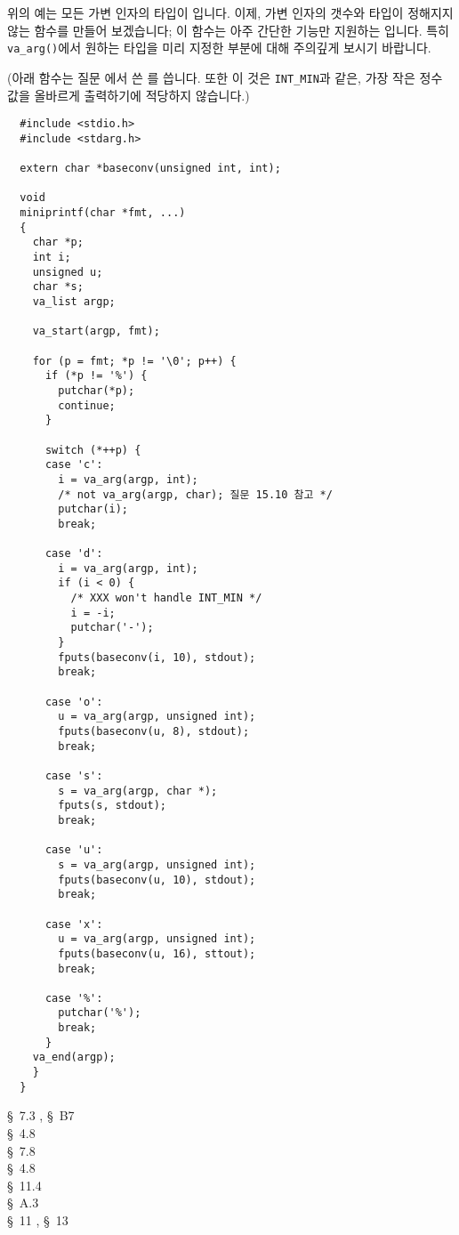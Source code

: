 \begin{faq}
        위의 예는 모든 가변 인자의 타입이 입니다. 이제, 가변 인자의 갯수와
        타입이 정해지지 않는 함수를 만들어 보겠습니다; 이 함수는 아주 간단한 기능만
        지원하는 입니다. 특히 \verb+va_arg()+에서 원하는 타입을 미리
        지정한 부분에 대해 주의깊게 보시기 바랍니다.

        (아래  함수는 질문 에서 쓴 를
        씁니다. 또한 이 것은 \verb+INT_MIN+과 같은, 가장 작은 정수 값을 올바르게
        출력하기에 적당하지 않습니다.)

\begin{verbatim}
  #include <stdio.h>
  #include <stdarg.h>

  extern char *baseconv(unsigned int, int);

  void
  miniprintf(char *fmt, ...)
  {
    char *p;
    int i;
    unsigned u;
    char *s;
    va_list argp;

    va_start(argp, fmt);

    for (p = fmt; *p != '\0'; p++) {
      if (*p != '%') {
        putchar(*p);
        continue;
      }

      switch (*++p) {
      case 'c':
        i = va_arg(argp, int);
        /* not va_arg(argp, char); 질문 15.10 참고 */
        putchar(i);
        break;

      case 'd':
        i = va_arg(argp, int);
        if (i < 0) {
          /* XXX won't handle INT_MIN */
          i = -i;
          putchar('-');
        }
        fputs(baseconv(i, 10), stdout);
        break;
 
      case 'o':
        u = va_arg(argp, unsigned int);
        fputs(baseconv(u, 8), stdout);
        break;

      case 's': 
        s = va_arg(argp, char *);
        fputs(s, stdout);
        break;

      case 'u':
        s = va_arg(argp, unsigned int);
        fputs(baseconv(u, 10), stdout);
        break;

      case 'x':
        u = va_arg(argp, unsigned int);
        fputs(baseconv(u, 16), sttout);
        break;

      case '%':
        putchar('%');
        break;
      }      
    va_end(argp);
    }
  }
\end{verbatim}
	\noindent {}

\R
	\cite{kr2} \S\ 7.3 , \S\ B7  \\
        \cite{ansi} \S\ 4.8 \\
	\cite{c89} \S\ 7.8 \\
	\cite{rationale} \S\ 4.8 \\
	\cite{hs} \S\ 11.4  \\
	\cite{ctp} \S\ A.3  \\ 
	\cite{pcs} \S\ 11 , \S\ 13 
\end{faq}

